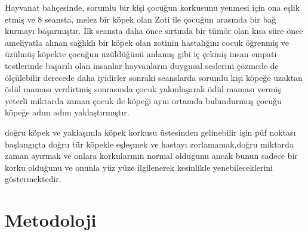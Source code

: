 \documentclass[12pt,a4paper]{article}
\begin{document}
\begin{enumerate}
			Hayvanat bahçesinde, sorumlu bir kişi çocuğun korkusunu yenmesi için ona eşlik etmiş ve 8 seansta, melez bir köpek olan Zoti ile çocuğun arasında bir bağ kurmayı başarmıştır.
			İlk seansta daha önce sırtında bir tümör olan kısa süre önce ameliyatla alınan sağlıklı bir  köpek olan zotinin hastalığını cocuk öğrenmiş ve üzülmüş köpekte çocuğun üzüldüğünü anlamış gibi iç çekmiş insan empati testlerinde başarılı olan insanlar hayvanların duygusal seslerini çözmede de ölçülebilir derecede daha iyidirler sonraki seanslarda sorumlu kişi  köpeğe uzaktan ödül maması verdirtmiş sonrasında çocuk yakınlaşarak ödül maması vermiş yeterli miktarda zaman çocuk ile köpeği aynı ortamda bulundurmuş çocuğu köpeğe adım adım yaklaştırmıştır.
			
			
			doğru köpek ve yaklaşımla köpek korkusu üstesinden gelinebilir işin püf noktası başlangıçta doğru tür köpekle eşleşmek ve hastayı zorlamamak,doğru miktarda zaman ayırmak ve onlara korkularının normal oldugunu ancak bunun sadece bir korku olduğunu ve onunla yüz yüze ilgilenerek kesinlikle yenebileceklerini göstermektedir\cite{ahsan2023deep}. \newline \newline

	\end{enumerate}
		\section{Metodoloji} 
		
\end{document}
